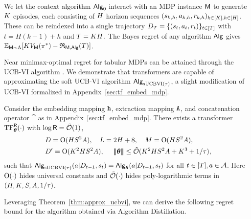 We let the context algorithm ${\mathsf{Alg}}_0$ interact with an MDP instance ${\mathsf{M}}$ to generate ${K}$ episodes, each consisting of ${H}$ horizon sequences $ ({s}_{k,h},{a}_{k,h},{r}_{k,h})_{k \in [{K}], h \in [{H}]}$. These can be reindexed into a single trajectory ${D}_{{T}} = \{ ({s}_t,{a}_t,{r}_t) \}_{t \in [{T}]}$ with $t=H(k-1)+h$ and ${T}={K}{H}$. The Bayes regret of any algorithm ${\mathsf{Alg}}$ gives $\mathbb{E}_{{\mathsf{M}}\sim{\Lambda}}[{K}{{V}}_{\mathsf{M}}({\pi}^*)-{\mathfrak{R}}_{{\mathsf{M}},{\mathsf{Alg}}}({T})]$.


Near minimax-optimal regret for tabular MDPs can be attained through the UCB-VI algorithm \citep{azar2017minimax}. We demonstrate that transformers are capable of approximating the soft UCB-VI algorithm ${\mathsf{Alg}}_{{\mathrm{sUCBVI}}(\tau)}$, a slight modification of UCB-VI formalized in Appendix~\ref{sec:tf_embed_mdp}.



\begin{theorem}\label{thm:approx_ucbvi}
Consider the embedding mapping ${\tt h}$, extraction mapping ${\tt A}$, and concatenation operator $\cat$ as in Appendix~\ref{sec:tf_embed_mdp}. There exists a transformer ${\rm TF}_{\boldsymbol \theta}^{{\mathsf{R}}}(\cdot)$ with $\log {\mathsf{R}} = {\tilde{\mathcal O}}(1)$,
\begin{equation}\label{eq:ucbvi_tf_param-main}
\begin{aligned}
&~D ={\mathrm{O}}({H}{S}^2{A}),~~~L= 2{H}+8,~~~M= {\mathrm{O}}({H}{S}^2{A}),\\
&~{D'}= {\mathrm{O}}({K}^2{H}{S}^2{A}),~~~~{\left|\!\left|\!\left|{{\boldsymbol \theta}}\right|\!\right|\!\right|}\leq {\tilde{\mathcal O}}({K}^2{H}{S}^2{A}+{K}^3+1/{\tau}),
\end{aligned}
\end{equation}
such that
${\mathsf{Alg}}_{{\mathrm{sUCBVI}}(\tau)}({a}|{D}_{t-1},{s}_t) = {\mathsf{Alg}}_{{{\boldsymbol \theta}}}({a}|{D}_{t-1},{s}_t)$ for all $t\in[T],{a}\in{\mathcal{A}}$. Here ${\mathrm{O}}(\cdot)$ hides universal constants and ${\tilde{\mathcal O}}(\cdot)$  hides poly-logarithmic terms in $({H},{K},{S},{A},1/{\tau})$.
\end{theorem}

Leveraging Theorem~\ref{thm:approx_ucbvi}, we can derive the following regret bound for the algorithm obtained via Algorithm Distillation.

